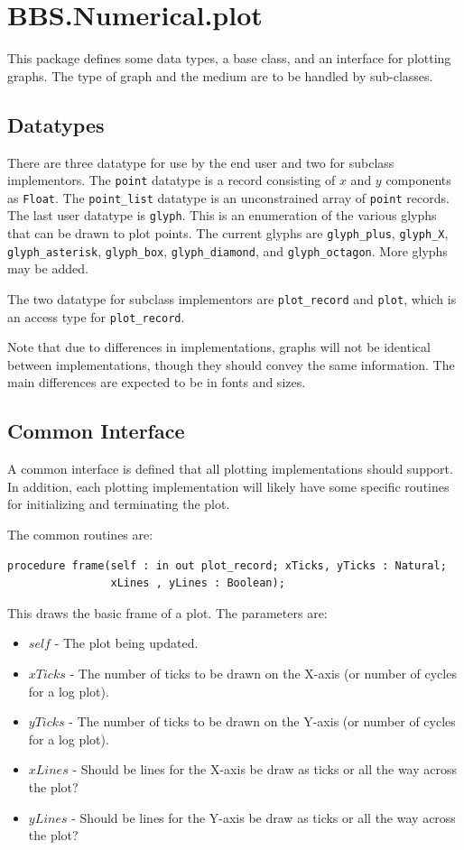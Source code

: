 \documentclass[10pt, openany]{book}
\newcommand{\indexfunc}[1]{\index[func]{#1}}
\newcommand{\datatype}[1]{\texttt{#1}}
\begin{document}
\section{BBS.Numerical.plot}
This package defines some data types, a base class, and an interface for plotting graphs.  The type of graph and the medium are to be handled by sub-classes.

\subsection{Datatypes}
There are three datatype for use by the end user and two for subclass implementors.  The \datatype{point} datatype is a record consisting of $x$ and $y$ components as \datatype{Float}.  The \datatype{point\_list} datatype is an unconstrained array of \datatype{point} records.  The last user datatype is \datatype{glyph}.  This is an enumeration of the various glyphs that can be drawn to plot points.  The current glyphs are \datatype{glyph\_plus}, \datatype{glyph\_X}, \datatype{glyph\_asterisk}, \datatype{glyph\_box}, \datatype{glyph\_diamond}, and \datatype{glyph\_octagon}.  More glyphs may be added.

The two datatype for subclass implementors are \datatype{plot\_record} and \datatype{plot}, which is an access type for \datatype{plot\_record}.

Note that due to differences in implementations, graphs will not be identical between implementations, though they should convey the same information.  The main differences are expected to be in fonts and sizes.

\subsection{Common Interface}
A common interface is defined that all plotting implementations should support.  In addition, each plotting implementation will likely have some specific routines for initializing and terminating the plot.

The common routines are:
\begin{lstlisting}
procedure frame(self : in out plot_record; xTicks, yTicks : Natural;
                xLines , yLines : Boolean);
\end{lstlisting}
\indexfunc{plot-frame}
This draws the basic frame of a plot.  The parameters are:
\begin{itemize}
  \item $self$ - The plot being updated.
  \item $xTicks$ - The number of ticks to be drawn on the X-axis (or number of cycles for a log plot).
  \item $yTicks$ - The number of ticks to be drawn on the Y-axis (or number of cycles for a log plot).
  \item $xLines$ - Should be lines for the X-axis be draw as ticks or all the way across the plot?
  \item $yLines$ - Should be lines for the Y-axis be draw as ticks or all the way across the plot?
\end{itemize}
\end{document}
